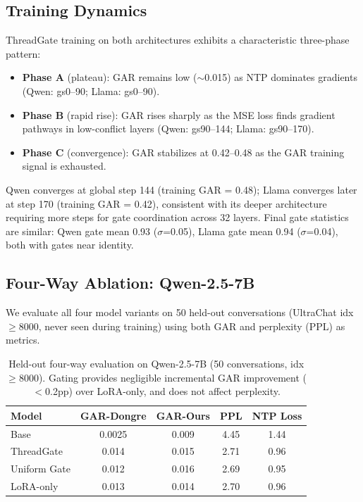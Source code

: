 \documentclass[11pt,a4paper]{article}
\begin{document}
\subsection{Training Dynamics}

ThreadGate training on both architectures exhibits a characteristic three-phase pattern:

\begin{itemize}
    \item \textbf{Phase A} (plateau): GAR remains low ($\sim$0.015) as NTP dominates gradients (Qwen: gs0--90; Llama: gs0--90).
    \item \textbf{Phase B} (rapid rise): GAR rises sharply as the MSE loss finds gradient pathways in low-conflict layers (Qwen: gs90--144; Llama: gs90--170).
    \item \textbf{Phase C} (convergence): GAR stabilizes at 0.42--0.48 as the GAR training signal is exhausted.
\end{itemize}

Qwen converges at global step 144 (training GAR = 0.48); Llama converges later at step 170 (training GAR = 0.42), consistent with its deeper architecture requiring more steps for gate coordination across 32 layers.
Final gate statistics are similar: Qwen gate mean 0.93 ($\sigma$=0.05), Llama gate mean 0.94 ($\sigma$=0.04), both with gates near identity.

\subsection{Four-Way Ablation: Qwen-2.5-7B}

We evaluate all four model variants on 50 held-out conversations (UltraChat idx$\geq$8000, never seen during training) using both GAR and perplexity (PPL) as metrics.

\begin{table}[h]
\centering
\caption{Held-out four-way evaluation on Qwen-2.5-7B (50 conversations, idx$\geq$8000). Gating provides negligible incremental GAR improvement ($<$0.2pp) over LoRA-only, and does not affect perplexity.}
\label{tab:qwen-heldout}
\begin{tabular}{lcccc}
\toprule
\textbf{Model} & \textbf{GAR-Dongre} & \textbf{GAR-Ours} & \textbf{PPL} & \textbf{NTP Loss} \\
\midrule
Base        & 0.0025 & 0.009 & 4.45 & 1.44 \\
ThreadGate  & 0.014  & 0.015 & 2.71 & 0.96 \\
Uniform Gate & 0.012 & 0.016 & 2.69 & 0.95 \\
LoRA-only   & 0.013  & 0.014 & 2.70 & 0.96 \\
\bottomrule
\end{tabular}
\end{table}
\end{document}

